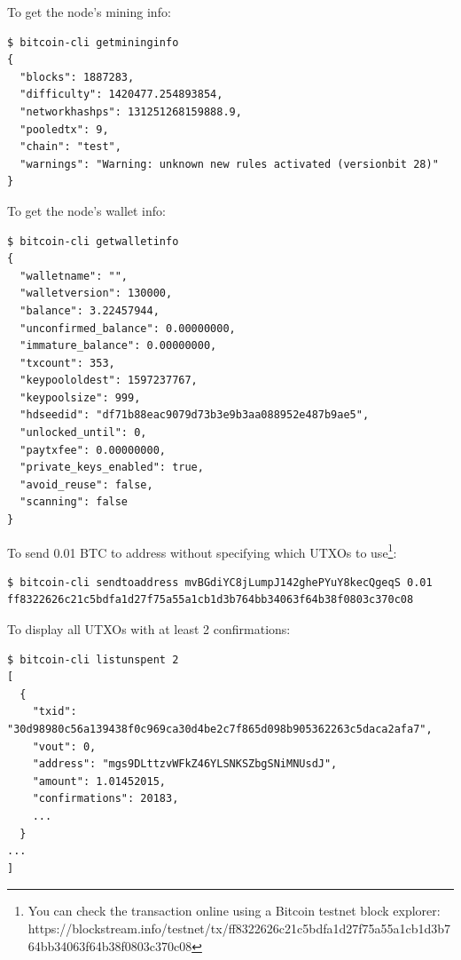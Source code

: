 \noindent To get the node's mining info:
\begin{emphbox}
\begin{lstlisting}[style=Bash]
$ bitcoin-cli getmininginfo
{
  "blocks": 1887283,
  "difficulty": 1420477.254893854,
  "networkhashps": 131251268159888.9,
  "pooledtx": 9,
  "chain": "test",
  "warnings": "Warning: unknown new rules activated (versionbit 28)"
}
\end{lstlisting}
\end{emphbox}
\vspace{1em}

\noindent To get the node's wallet info:
\begin{emphbox}
\begin{lstlisting}[style=Bash]
$ bitcoin-cli getwalletinfo
{
  "walletname": "",
  "walletversion": 130000,
  "balance": 3.22457944,
  "unconfirmed_balance": 0.00000000,
  "immature_balance": 0.00000000,
  "txcount": 353,
  "keypoololdest": 1597237767,
  "keypoolsize": 999,
  "hdseedid": "df71b88eac9079d73b3e9b3aa088952e487b9ae5",
  "unlocked_until": 0,
  "paytxfee": 0.00000000,
  "private_keys_enabled": true,
  "avoid_reuse": false,
  "scanning": false
}
\end{lstlisting}
\end{emphbox}
\vspace{1em}


\noindent To send 0.01 BTC to address  without specifying which UTXOs to use\footnote{You can check the transaction online using a Bitcoin testnet block explorer: https://blockstream.info/testnet/tx/ff8322626c21c5bdfa1d27f75a55a1cb1d3b764bb34063f64b38f0803c370c08}:
\begin{emphbox}
\begin{lstlisting}[style=Bash]
$ bitcoin-cli sendtoaddress mvBGdiYC8jLumpJ142ghePYuY8kecQgeqS 0.01
ff8322626c21c5bdfa1d27f75a55a1cb1d3b764bb34063f64b38f0803c370c08
\end{lstlisting}
\end{emphbox}
\vspace{1em}

\noindent To display all UTXOs with at least 2 confirmations:
\begin{emphbox}
\begin{lstlisting}[style=Bash]
$ bitcoin-cli listunspent 2
[
  {
    "txid": "30d98980c56a139438f0c969ca30d4be2c7f865d098b905362263c5daca2afa7",
    "vout": 0,
    "address": "mgs9DLttzvWFkZ46YLSNKSZbgSNiMNUsdJ",
    "amount": 1.01452015,
    "confirmations": 20183,
    ...
  }
... 
]
\end{lstlisting}
\end{emphbox}
\vspace{1em}

